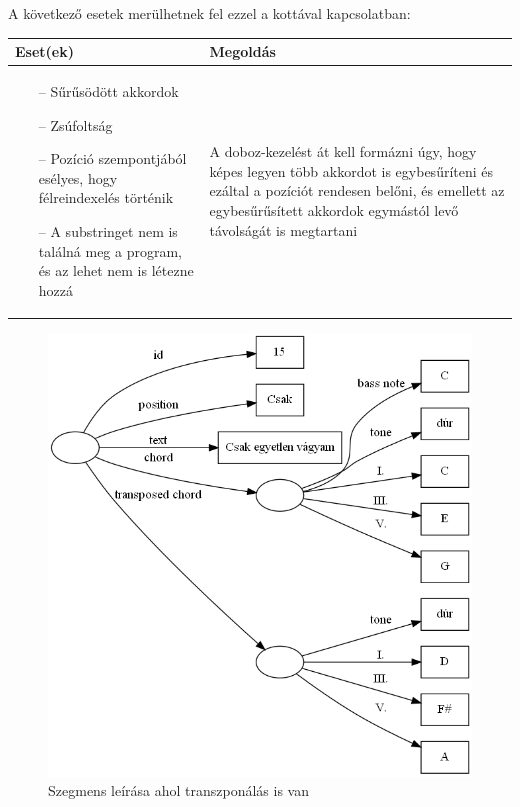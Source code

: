 A következő esetek merülhetnek fel ezzel a kottával kapcsolatban:
\begin{center}
	\begin{tabular}{ |p{7cm}|p{7cm}| }
		\hline
		Eset(ek) & Megoldás\\ 
		\hline
		\begin{itemize}
			\item[--] Sűrűsödött akkordok
			\item[--] Zsúfoltság
			\item[--] Pozíció szempontjából esélyes, hogy félreindexelés történik
			\item[--] A substringet nem is találná meg a program, és az lehet nem is létezne hozzá
		\end{itemize} & A doboz-kezelést át kell formázni úgy, hogy képes legyen több akkordot is egybesűríteni és ezáltal a pozíciót rendesen belőni, és emellett az egybesűrűsített akkordok egymástól levő távolságát is megtartani \\ 
		\hline
	\end{tabular}
\end{center}
\newpage
\begin{figure}[h]
	\includegraphics[scale=0.5]{images/img_src/rdf_graph_5.png}
	\caption{Szegmens leírása ahol transzponálás is van}
	\label{fig:graph5}
\end{figure}
